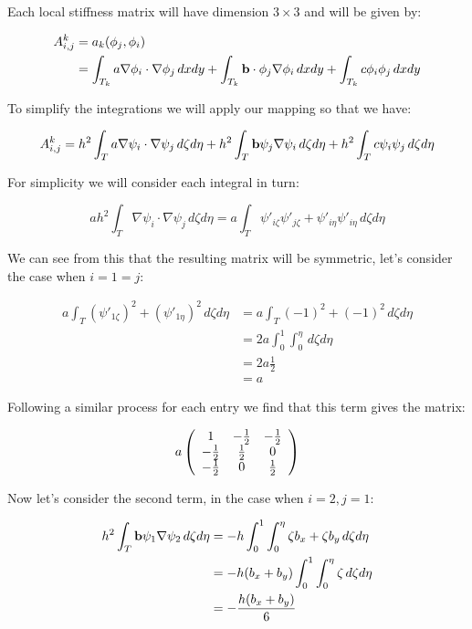 Each local stiffness matrix will have dimension $3 \times 3$ and will be given
by:

\begin{align*}
    A^k_{i,j} &= a_k(\phi_j, \phi_i) \\
     &= \int_{T_k}a\nabla\phi_i\cdot\nabla\phi_j\,dxdy +
        \int_{T_k}\mathbf{b}\cdot\phi_j\nabla\phi_i\,dxdy +
        \int_{T_k}c\phi_i\phi_j\,dxdy
\end{align*}

To simplify the integrations we will apply our mapping so that we have:

\[
    A^k_{i,j} = h^2\int_Ta\nabla\psi_i\cdot\nabla\psi_j\,d\zeta d\eta +
                h^2\int_T\mathbf{b}\psi_j\nabla\psi_i\,d\zeta d\eta +
                h^2\int_Tc\psi_i\psi_j\,d\zeta d\eta
\]

For simplicity we will consider each integral in turn:

\[
    ah^2\int_T\nabla\psi_i\cdot\nabla\psi_j\,d\zeta d\eta =
    a\int_T\psi'_{i\zeta}\psi'_{j\zeta} +
        \psi'_{i\eta}\psi'_{i\eta}\,d\zeta d\eta
\]

We can see from this that the resulting matrix will be symmetric, let's
consider the case when $i = 1 = j$:

\begin{align*}
    a\int_T(\psi'_{1\zeta})^2 + (\psi'_{1\eta})^2\,d\zeta d\eta & =
        a\int_T(-1)^2 + (-1)^2\,d\zeta d\eta \\
    &= 2a\int_0^1\int_0^\eta\,d\zeta d\eta \\
    &= 2a\frac{1}{2} \\
    &= a
\end{align*}

Following a similar process for each entry we find that this term gives the
matrix:

\begin{equation}\label{eq:stiffness_term_1}
    a\left(\begin{array}{c c c}
        1      & -\frac{1}{2} & -\frac{1}{2} \\
        -\frac{1}{2} & \frac{1}{2}  & 0 \\
        -\frac{1}{2} & 0      & \frac{1}{2}
    \end{array}\right)
\end{equation}

Now let's consider the second term, in the case when $i = 2, j = 1$:

\begin{align*}
    h^2\int_T{\mathbf{b}\psi_1\nabla\psi_2}\, d\zeta d\eta &=
    -h\int_0^1\int_0^\eta{\zeta b_x + \zeta b_y}\, d\zeta d\eta \\
    &= -h(b_x + b_y)\int_0^1\int_0^\eta{\zeta}\, d\zeta d\eta \\
    &= -\frac{h(b_x + b_y)}{6}
\end{align*}

